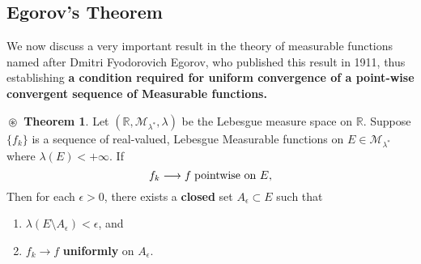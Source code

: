 \documentclass{article}
\theoremstyle{definition}
\newtheorem{theorem}{$\boxed{\boxed{\circledast}}$ Theorem}
\theoremstyle{remark}
\theoremstyle{definition}
\theoremstyle{definition}
\theoremstyle{definition}
\newcommand{\R}{\mathbb{R}}
\newcommand{\set}[1]{\mathscr{#1}}
\newcommand{\msigm}[1]{\set{M}_{#1}}
\newcommand{\lm}[1]{\lambda\left (#1\right )}
\begin{document}
\subsection{Egorov's Theorem}
We now discuss a very important result in the theory of measurable functions named after Dmitri Fyodorovich Egorov, who published this result in 1911, thus establishing \textbf{a condition required for uniform convergence of a point-wise convergent sequence of Measurable functions.}
\begin{theorem}
	\label{T-3}
	Let $ (\R,\msigm{\lambda^*},\lambda) $ be the Lebesgue measure space on $ \R $. Suppose $ \{f_k\} $ is a sequence of real-valued, Lebesgue Measurable functions on $ E \in \msigm{\lambda^*} $ where $ \lm{E} < +\infty $. If 
	\[f_k \longrightarrow f\;\text{pointwise on $ E $,}\]
	Then for each $ \epsilon > 0 $, there exists a \textbf{closed} set $ A_\epsilon \subset E$ such that
	\begin{enumerate}
		\item {$ \lm{E\setminus A_\epsilon} < \epsilon $, and}
		\item {$ f_k \longrightarrow f $ \textbf{uniformly} on $ A_\epsilon $.}
	\end{enumerate}
\end{theorem} 
\end{document}
